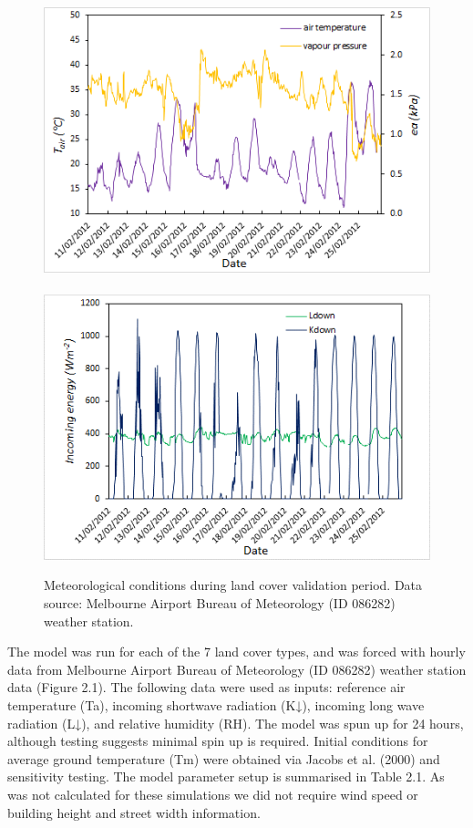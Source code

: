 \documentclass[final,3p,times,authoryear]{elsarticle}
\begin{document}
\begin{figure}[!htbp]
\includegraphics[trim=0mm 0mm 0mm 0mm, clip,scale=0.5]{images/met1.png}
~
\includegraphics[trim=0mm 0mm 0mm 0mm, clip,scale=0.5]{images/met2.png}
 \caption{Meteorological conditions during land cover validation period. Data source: Melbourne Airport Bureau of Meteorology (ID 086282) weather station.} \label{fig:met}
\end{figure}



The model was run for each of the 7 land cover types, and was forced with hourly data from Melbourne Airport Bureau of Meteorology (ID 086282) weather station data (Figure 2.1).  The following data were used as inputs: reference air temperature (Ta), incoming shortwave radiation (K↓), incoming long wave radiation (L↓), and relative humidity (RH). The model was spun up for 24 hours, although testing suggests minimal spin up is required. Initial conditions for average ground temperature (Tm) were obtained via Jacobs et al. (2000) and sensitivity testing. The model parameter setup is summarised in Table 2.1. As  was not calculated for these simulations we did not require wind speed or building height and street width information. 
\end{document}
